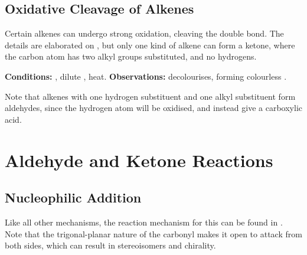 

		\pagebreak
		\subsection{Oxidative Cleavage of Alkenes}

			Certain alkenes can undergo strong oxidation, cleaving the double bond. The details are elaborated on
			\hyperlink{OxidativeCleavageOfAlkenes}{}, but only one kind of alkene can form a ketone, where the carbon
			atom has two alkyl groups substituted, and no hydrogens.

			\vspace{1.5em}
			\vbox{\textbf{Conditions:}	\tabto{35mm}, dilute , heat.}
			\vbox{\textbf{Observations:}  decolourises, forming colourless .}



			Note that alkenes with one hydrogen substituent and one alkyl substituent  form aldehydes, since the hydrogen
			atom will be oxidised, and instead give a carboxylic acid.



	\pagebreak
	\section{Aldehyde and Ketone Reactions}

		\subsection{Nucleophilic Addition}

			Like all other mechanisms, the reaction mechanism for this can be found in
			\hyperlink{AppendixNucleophilicAddition}{}. Note that the trigonal-planar nature of the carbonyl makes it
			open to attack from both sides, which can result in stereoisomers and chirality.



